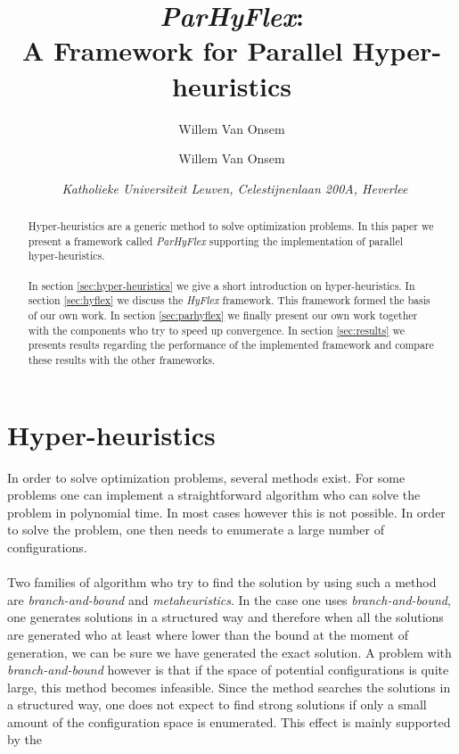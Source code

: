 \documentclass[a4paper,10pt]{article}
\title{\emph{ParHyFlex}:\\A Framework for Parallel Hyper-heuristics}
\author{Willem Van Onsem}
\author{Willem Van Onsem \affila}
\date{\affila\ \textit{Katholieke Universiteit Leuven, Celestijnenlaan 200A, Heverlee}}
\newcommand{\seclab}[1]{\label{sec:#1}}
\newcommand{\secref}[1]{\ref{sec:#1}}
\begin{document}
\ttl
\thispagestyle{empty}


\begin{abstract}
\noindent
Hyper-heuristics are a generic method to solve optimization problems. In this paper we present a framework called \emph{ParHyFlex} supporting the implementation of parallel hyper-heuristics.
\paragraph{}
In section \secref{hyper-heuristics} we give a short introduction on hyper-heuristics. In section \secref{hyflex} we discuss the \emph{HyFlex} framework. This framework formed the basis of our own work. In section \secref{parhyflex} we finally present our own work together with the components who try to speed up convergence. In section \secref{results} we presents results regarding the performance of the implemented framework and compare these results with the other frameworks.
\end{abstract}

\section{Hyper-heuristics}
\seclab{hyper-heuristics}
In order to solve optimization problems, several methods exist. For some problems one can implement a straightforward algorithm who can solve the problem in polynomial time. In most cases however this is not possible. In order to solve the problem, one then needs to enumerate a large number of configurations.

\paragraph{}
Two families of algorithm who try to find the solution by using such a method are \emph{branch-and-bound} and \emph{metaheuristics}. In the case one uses \emph{branch-and-bound}, one generates solutions in a structured way and therefore when all the solutions are generated who at least where lower than the bound at the moment of generation, we can be sure we have generated the exact solution. A problem with \emph{branch-and-bound} however is that if the space of potential configurations is quite large, this method becomes infeasible. Since the method searches the solutions in a structured way, one does not expect to find strong solutions if only a small amount of the configuration space is enumerated. This effect is mainly supported by the 
\end{document}
